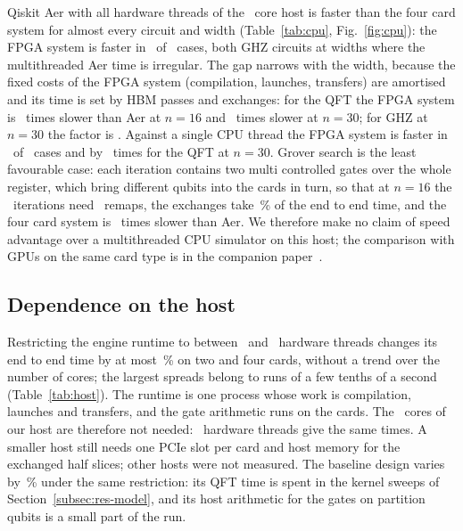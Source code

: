Qiskit Aer with all hardware threads of the \NumHostCores~core host is faster than the four card system for
almost every circuit and width (Table~\ref{tab:cpu}, Fig.~\ref{fig:cpu}): the FPGA system is faster in
\NumCpuFpgaFaster~of \NumCpuCases~cases, both GHZ circuits at widths where the multithreaded Aer time is irregular.
The gap narrows with the width, because the fixed costs of the FPGA system (compilation, launches, transfers) are
amortised and its time is set by HBM passes and exchanges: for the QFT the FPGA system is \NumCpuRatioQftSixteen~times
slower than Aer at $n=16$ and \NumCpuRatioQft~times slower at $n=30$; for GHZ at $n=30$ the factor is \NumCpuRatioGhz.
Against a single CPU thread the FPGA system is faster in \NumCpuFasterThanAerOne~of \NumCpuAerOneCases~cases and by
\NumCpuAerOneOverQft~times for the QFT at $n=30$. Grover search is the least favourable case: each iteration contains two
multi controlled gates over the whole register, which bring different qubits into the cards in turn, so that at $n=16$
the \NumGroverSixteenIters~iterations need \NumGroverSixteenRemaps~remaps, the exchanges take \NumGroverSixteenExchPct\,\%
of the end to end time, and the four card system is \NumCpuRatioGroverSixteen~times slower than Aer. We therefore make no claim of speed advantage over a multithreaded CPU
simulator on this host; the comparison with GPUs on the same card type is in the companion paper~\cite{tiwari2026fpga30}.

\subsection{Dependence on the host}\label{subsec:res-host}

\begin{table}[t]
\caption{End to end time (median, seconds) with the host process and its workers restricted to the first $N$ hardware
threads (logical CPUs $0$ to $N-1$) of the \NumHostCores~core, \NumHostThreads~thread host.}\label{tab:host}

\end{table}

Restricting the engine runtime to between \NumHostCoresMin~and \NumHostCoresMax~hardware threads changes its end to
end time by at most \NumHostSpreadEnginePct\,\% on two and four cards, without a trend over the number of cores; the
largest spreads belong to runs of a few tenths of a second (Table~\ref{tab:host}). The runtime is one process whose
work is compilation, launches and transfers, and the gate arithmetic runs on the cards. The \NumHostCores~cores of our
host are therefore not needed: \NumHostCoresMin~hardware threads give the same times. A smaller host still needs one PCIe slot per
card and host memory for the exchanged half slices; other hosts were not measured.
The baseline design varies by \NumHostSpreadBaselinePct\,\% under the same restriction: its QFT time is spent
in the kernel sweeps of Section~\ref{subsec:res-model}, and its host arithmetic for the gates on partition qubits is a
small part of the run.

